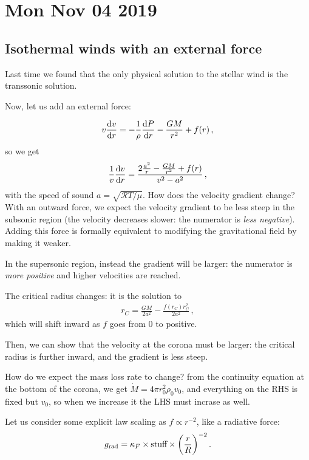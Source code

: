 \documentclass[main.tex]{subfiles}
\begin{document}
\section*{Mon Nov 04 2019}


\subsection{Isothermal winds with an external force}

Last time we found that the only physical solution to the stellar wind is the transsonic solution.

Now, let us add an external force:

%
\begin{align}
  v \dv{v}{r} = - \frac{1}{\rho } \dv{P}{r} - \frac{GM}{r^2} + f(r)
\,,
\end{align}
%
so we get 
%
\begin{align}
  \frac{1}{v} \dv{v}{r} = \frac{2 \frac{a^2}{r} - \frac{GM}{r^2} + f(r)}{v^2 - a^2}
\,,
\end{align}
%
with the speed of sound \(a = \sqrt{\mathcal{R} T / \mu } \). How does the velocity gradient change?
With an outward force, we expect the velocity gradient to be less steep in the subsonic region (the velocity decreases slower: the numerator is \emph{less negative}).
Adding this force is formally equivalent to modifying the gravitational field by making it weaker. 

In the supersonic region, instead the gradient will be larger: the numerator is \emph{more positive} and higher velocities are reached.

The critical radius changes: it is the solution to 
%
\begin{align}
  r_C = \frac{GM}{2 a^2} - \frac{f(r_C) r_C^2}{2 a^2}
\,,
\end{align}
%
which will shift inward as \(f\) goes from 0 to positive.

Then, we can show that the velocity at the corona must be larger: the critical radius is further inward, and the gradient is less steep.

How do we expect the mass loss rate to change? from the continuity equation at the bottom of the corona, we get \(\dot{M} = 4 \pi r_0^2 \rho_0 v_0 \), and everything on the RHS is fixed but \(v_0 \), so when we increase it the LHS must incrase as well.

Let us consider some explicit law scaling as \(f \propto r^{-2}\), like a radiative force: 
%
\begin{align}
  g _{\text{rad}} = \kappa_F \times \text{stuff} \times \qty(\frac{r}{R})^{-2}
\,.
\end{align}
\end{document}
